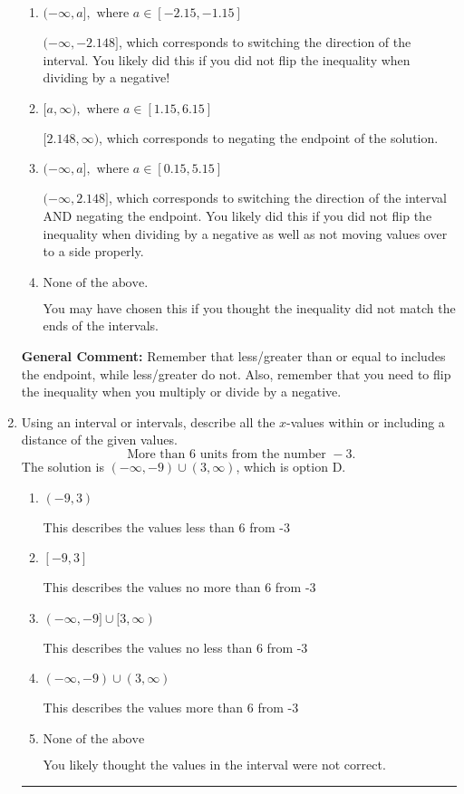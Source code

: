 \documentclass{extbook}[14pt]
\newcommand{\litem}[1]{\item #1

\rule{\textwidth}{0.4pt}}
\begin{document}
\begin{enumerate}
{\begin{enumerate}[label=\Alph*.]
* $[-2.148, \infty)$, which is the correct option.
\item \( (-\infty, a], \text{ where } a \in [-2.15, -1.15] \)

 $(-\infty, -2.148]$, which corresponds to switching the direction of the interval. You likely did this if you did not flip the inequality when dividing by a negative!
\item \( [a, \infty), \text{ where } a \in [1.15, 6.15] \)

 $[2.148, \infty)$, which corresponds to negating the endpoint of the solution.
\item \( (-\infty, a], \text{ where } a \in [0.15, 5.15] \)

 $(-\infty, 2.148]$, which corresponds to switching the direction of the interval AND negating the endpoint. You likely did this if you did not flip the inequality when dividing by a negative as well as not moving values over to a side properly.
\item \( \text{None of the above}. \)

You may have chosen this if you thought the inequality did not match the ends of the intervals.
\end{enumerate}

\textbf{General Comment:} Remember that less/greater than or equal to includes the endpoint, while less/greater do not. Also, remember that you need to flip the inequality when you multiply or divide by a negative.
}
\litem{
Using an interval or intervals, describe all the $x$-values within or including a distance of the given values.
\[ \text{ More than } 6 \text{ units from the number } -3. \]
The solution is \( (-\infty, -9) \cup (3, \infty) \), which is option D.\begin{enumerate}[label=\Alph*.]
\item \( (-9, 3) \)

This describes the values less than 6 from -3
\item \( [-9, 3] \)

This describes the values no more than 6 from -3
\item \( (-\infty, -9] \cup [3, \infty) \)

This describes the values no less than 6 from -3
\item \( (-\infty, -9) \cup (3, \infty) \)

This describes the values more than 6 from -3
\item \( \text{None of the above} \)

You likely thought the values in the interval were not correct.
\end{enumerate}

}
\end{enumerate}
\end{document}
